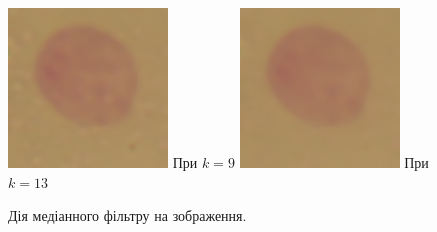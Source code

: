 \begin{figure}[t!]
	\includegraphics[width=0.95\linewidth]{Figures/Chapter2/1d.png}
	При \(k = 9\)
	\endminipage\hfill
	\centering	
	\includegraphics[width=0.95\linewidth]{Figures/Chapter2/1e.png}
	При \(k = 13\)
	\endminipage\hfill	
	
	\caption{Дія медіанного фільтру на зображення.}
	\label{fig:median_cells}
\end{figure}

